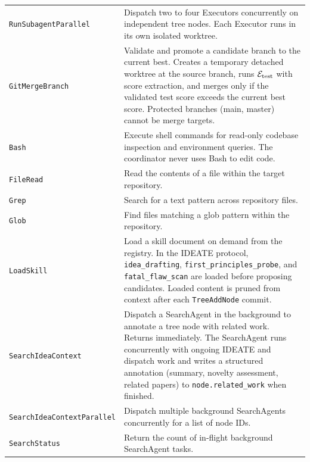 \begin{xltabular}{\linewidth}{>{\raggedright\arraybackslash}p{3.8cm}>{\raggedright\arraybackslash}X}
\texttt{RunSubagentParallel} & Dispatch two to four Executors concurrently on independent tree nodes. Each Executor runs in its own isolated worktree. \\
\texttt{GitMergeBranch} & Validate and promote a candidate branch to the current best. Creates a temporary detached worktree at the source branch, runs $\mathcal{E}_{\mathrm{test}}$ with score extraction, and merges only if the validated test score exceeds the current best score. Protected branches (main, master) cannot be merge targets. \\
\texttt{Bash} & Execute shell commands for read-only codebase inspection and environment queries. The coordinator never uses Bash to edit code. \\
\texttt{FileRead} & Read the contents of a file within the target repository. \\
\texttt{Grep} & Search for a text pattern across repository files. \\
\texttt{Glob} & Find files matching a glob pattern within the repository. \\
\texttt{LoadSkill} & Load a skill document on demand from the registry. In the IDEATE protocol, \texttt{idea\_drafting}, \texttt{first\_principles\_probe}, and \texttt{fatal\_flaw\_scan} are loaded before proposing candidates. Loaded content is pruned from context after each \texttt{TreeAddNode} commit. \\
\texttt{SearchIdeaContext} & Dispatch a SearchAgent in the background to annotate a tree node with related work. Returns immediately. The SearchAgent runs concurrently with ongoing IDEATE and dispatch work and writes a structured annotation (summary, novelty assessment, related papers) to \texttt{node.related\_work} when finished. \\
\texttt{SearchIdeaContextParallel} & Dispatch multiple background SearchAgents concurrently for a list of node IDs. \\
\texttt{SearchStatus} & Return the count of in-flight background SearchAgent tasks. \\
\end{xltabular}
\endgroup


